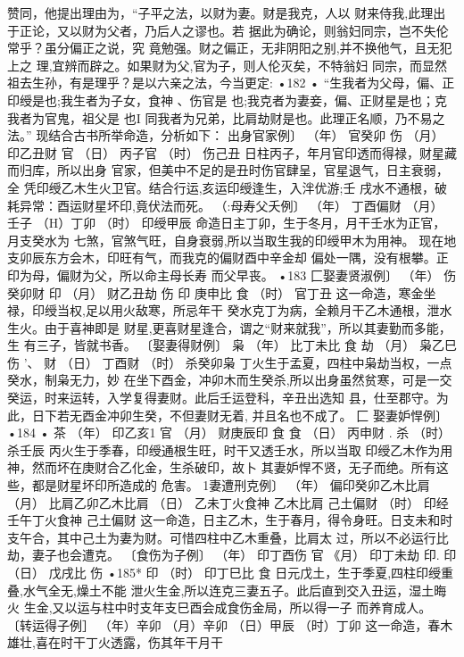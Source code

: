 赞同，他提出理由为，“子平之法，以财为妻。财是我克，人以
财来侍我,此理出于正论，又以财为父者，乃后人之谬也。若
据此为确论，则翁妇同宗，岂不失伦常乎？虽分偏正之说，究
竟勉强。财之偏正，无非阴阳之别,并不换他气，且无犯上之
理,宜辨而辟之。如果财为父,官为子，则人伦灭矣，不特翁妇
同宗，而显然祖去生孙，有是理乎？是以六亲之法，今当更定:
•182 •
“生我者为父母，偏、正印绶是也;我生者为子女，食神 、伤官是
也;我克者为妻妾，偏、正财星是也；克我者为官鬼，祖父是
也I 同我者为兄弟，比肩劫财是也。此理正名顺，乃不易之
法。”
现结合古书所举命造，分析如下：
出身官家例〕
（年） 官癸卯
伤
（月） 印乙丑财
官
（日） 丙子官
（时） 伤己丑
日柱丙子，年月官印透而得禄，财星藏而归库，所以出身
官家，但美中不足的是丑时伤官肆呈，官星退气，日主衰弱，全
凭印绶乙木生火卫官。结合行运,亥运印绶逢生，入泮优游;壬
戌水不通根，破耗异常：酉运财星坏印,竟伏法而死。
（:母寿父夭例〕
（年） 丁酉偏财
（月） 壬子
（H）丁卯
（时） 印绶甲辰
命造日主丁卯，生于冬月，月干壬水为正官，月支癸水为
七煞，官煞气旺，自身衰弱,所以当取生我的印绶甲木为用神。
现在地支卯辰东方会木，印旺有气，而我克的偏财酉中辛金却
偏处一隅，没有根攀。正印为母，偏财为父，所以命主母长寿
而父早丧。
•183
匚娶妻贤淑例〕
（年） 伤癸卯财
印
（月） 财乙丑劫
伤
印
庚申比
食
（时） 官丁丑
这一命造，寒金坐禄，印绶当权,足以用火敌寒，所忌年干
癸水克丁为病，全赖月干乙木通根，泄水生火。由于喜神即是
财星,更喜财星逢合，谓之“财来就我”，所以其妻勤而多能，生
有三子，皆就书香。
〔娶妻得财例〕
枭
（年） 比丁未比
食
劫
（月） 枭乙巳伤 '、
财
（日） 丁酉财
（时） 杀癸卯枭
丁火生于孟夏，四柱中枭劫当权，一点癸水，制枭无力，妙
在坐下酉金，冲卯木而生癸杀,所以出身虽然贫寒，可是一交
癸运，时来运转，入学复得妻财。此后壬运登科，辛丑出选知
县，仕至郡守。为此，日下若无酉金冲卯生癸，不但妻财无着,
并且名也不成了。
匚 娶妻妒悍例〕
•184 •
茶
（年） 印乙亥1
官
（月） 财庚辰印
食
食
（日） 丙申财 .
杀
（时） 杀壬辰
丙火生于季春，印绶通根生旺，时干又透壬水，所以当取
印绶乙木作为用神，然而坏在庚财合乙化金，生杀破印，故卜
其妻妒悍不贤，无子而绝。所有这些，都是财星坏印所造成的
危害。
1妻遭刑克例〕
（年） 偏印癸卯乙木比肩
（月） 比肩乙卯乙木比肩
（日） 乙未丁火食神 乙木比肩 己土偏财
（时） 印经壬午丁火食神 己土偏财
这一命造，日主乙木，生于春月，得令身旺。日支未和时
支午合，其中己土为妻为财。可惜四柱中乙木重叠，比肩太
过，所以不必运行比劫，妻子也会遭克。
〔食伤为子例〕
（年） 印丁酉伤
官
《月） 印丁未劫
印.
印
（日） 戊戌比
伤
•185*
印
（时） 印丁巳比
食
日元戊土，生于季夏,四柱印绶重叠,水气全无,燥土不能
泄火生金,所以连克三妻五子。此后直到交入丑运，湿土晦火
生金,又以运与柱中时支年支巳酉会成食伤金局，所以得一子
而养育成人。
〔转运得子例］
（年）辛卯
（月）辛卯
（日）甲辰
（时）丁卯
这一命造，春木雄壮,喜在时干丁火透露，伤其年干月干
